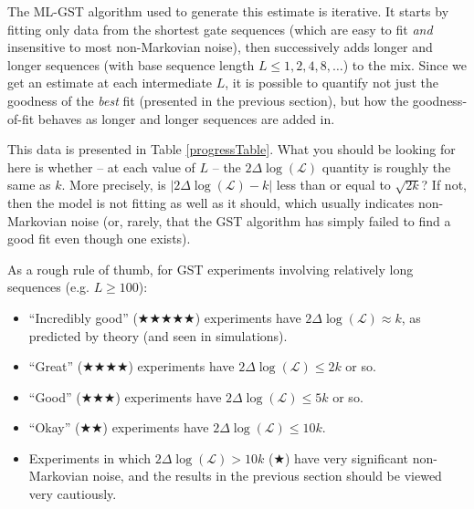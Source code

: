 \documentclass{article}[11pt]
\begin{document}
{The ML-GST algorithm used to generate this estimate is iterative.  It starts by fitting only data from the shortest gate sequences (which are easy to fit \emph{and} insensitive to most non-Markovian noise), then successively adds longer and longer sequences (with base sequence length $L\leq 1,2,4,8,\ldots$) to the mix.  Since we get an estimate at each intermediate $L$, it is possible to quantify not just the goodness of the \emph{best} fit (presented in the previous section), but how the goodness-of-fit behaves as longer and longer sequences are added in.

This data is presented in Table \ref{progressTable}.  What you should be looking for here is whether -- at each value of $L$ -- the $2\Delta\log(\mathcal{L})$ quantity is roughly the same as $k$.  More precisely, is $|2\Delta\log(\mathcal{L})-k|$ less than or equal to $\sqrt{2k}$?  If not, then the model is not fitting as well as it should, which usually indicates non-Markovian noise (or, rarely, that the GST algorithm has simply failed to find a good fit even though one exists).

As a rough rule of thumb, for GST experiments involving relatively long sequences (e.g. $L\geq100$):
\begin{itemize}
\item ``Incredibly good'' ($\bigstar\bigstar\bigstar\bigstar\bigstar$) experiments have $2\Delta\log(\mathcal{L}) \approx k$, as predicted by theory (and seen in simulations).
\item ``Great'' ($\bigstar\bigstar\bigstar\bigstar$) experiments have $2\Delta\log(\mathcal{L}) \leq 2k$ or so.
\item ``Good'' ($\bigstar\bigstar\bigstar$) experiments have $2\Delta\log(\mathcal{L}) \leq 5k$ or so.
\item ``Okay'' ($\bigstar\bigstar$) experiments have $2\Delta\log(\mathcal{L}) \leq 10k$.
\item Experiments in which $2\Delta\log(\mathcal{L}) > 10k$ ($\bigstar$) have very significant non-Markovian noise, and the results in the previous section should be viewed very cautiously.
\end{itemize}

}
\end{document}
